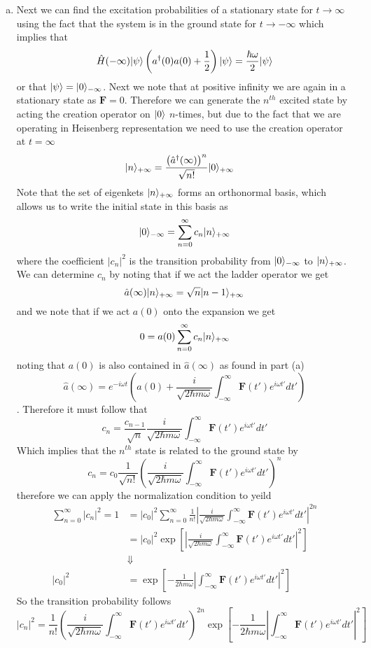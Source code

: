 \documentclass[11pt]{article}
\numberwithin{equation}{section}
\begin{document}
\begin{enumerate}[(a)]
\item Next we can find the excitation probabilities of a stationary state for 
$t\rightarrow\infty$ using the fact that the system is in the ground state for 
$t\rightarrow-\infty$ which implies that
$$\hat{H}(-\infty)|{\psi}\rangle \left(a^{\dagger}(0)a(0)+\frac{1}{2}\right)|{\psi}\rangle = \frac{\hbar\omega}{2}|{\psi}\rangle$$
or that $|{\psi}\rangle=|{0}\rangle_{-\infty}$. Next we note that at positive infinity we are again in a 
stationary state as $\mathbf{F}=0$. Therefore we can generate the $n^{th}$ excited state by
acting the creation operator on $|{0}\rangle$ $n$-times, but due to the fact that we are 
operating in Heisenberg representation we need to use the creation operator at $t=\infty$
\begin{align*}
|{n}\rangle_{+\infty} &= \frac{\left(\hat{a}^{\dagger}(\infty)\right)^n}{\sqrt{n!}}|{0}\rangle_{+\infty}
\end{align*}
Note that the set of eigenkets $|{n}\rangle_{+\infty}$ forms an orthonormal basis, which allows 
us to write the initial state in this basis as
$$|{0}\rangle_{-\infty} = \sum_{n=0}^{\infty}c_n|{n}\rangle_{+\infty}$$
where the coefficient $|c_n|^2$ is the transition probability from $|{0}\rangle_{-\infty}$ to 
$|{n}\rangle_{+\infty}$. We can determine $c_n$ by noting that if we act the ladder operator
we get
$$\hat{a}(\infty)|{n}\rangle_{+\infty} = \sqrt{n}|{n-1}\rangle_{+\infty}$$
and we note that if we act $a(0)$ onto the expansion we get
$$0 = a(0)\sum_{n=0}^{\infty}c_n|{n}\rangle_{+\infty}$$
noting that $a(0)$ is also contained in $\hat{a}(\infty)$ as found in part (a)
$$\hat{a}(\infty) = e^{-i\omega{t}}\left(a(0) + \frac{i}{\sqrt{2\hbar{m}\omega}}\int_{-\infty}^{\infty}\mathbf{F}(t')e^{i\omega{t'}}dt'\right)$$
. Therefore it must follow that
$$c_n = \frac{c_{n-1}}{\sqrt{n}}\frac{i}{\sqrt{2\hbar{m}\omega}}\int_{-\infty}^{\infty}\mathbf{F}(t')e^{i\omega{t'}}dt'$$
Which implies that the $n^{th}$ state is related to the ground state by
$$c_n = c_0\frac{1}{\sqrt{n!}}\left(\frac{i}{\sqrt{2\hbar{m}\omega}}\int_{-\infty}^{\infty}\mathbf{F}(t')e^{i\omega{t'}}dt'\right)^n$$
therefore we can apply the normalization condition to yeild
\begin{align*}
\sum_{n=0}^{\infty}|c_n|^2 = 1 &= |c_0|^2\sum_{n=0}^{\infty}\frac{1}{n!}\left|\frac{i}{\sqrt{2\hbar{m}\omega}}\int_{-\infty}^{\infty}\mathbf{F}(t')e^{i\omega{t'}}dt'\right|^{2n}\\
&= |c_0|^2\exp\left[\left|\frac{i}{\sqrt{2\hbar{m}\omega}}\int_{-\infty}^{\infty}\mathbf{F}(t')e^{i\omega{t'}}dt'\right|^{2}\right]\\
&\Downarrow\\
|c_0|^2 &= \exp\left[-\frac{1}{2\hbar{m}\omega}\left|\int_{-\infty}^{\infty}\mathbf{F}(t')e^{i\omega{t'}}dt'\right|^{2}\right]
\end{align*}
So the transition probability follows
$$|c_n|^2 = \frac{1}{n!}\left(\frac{i}{\sqrt{2\hbar{m}\omega}}\int_{-\infty}^{\infty}\mathbf{F}(t')e^{i\omega{t'}}dt'\right)^{2n}\exp\left[-\frac{1}{2\hbar{m}\omega}\left|\int_{-\infty}^{\infty}\mathbf{F}(t')e^{i\omega{t'}}dt'\right|^{2}\right]$$
\end{enumerate}
\end{document}
